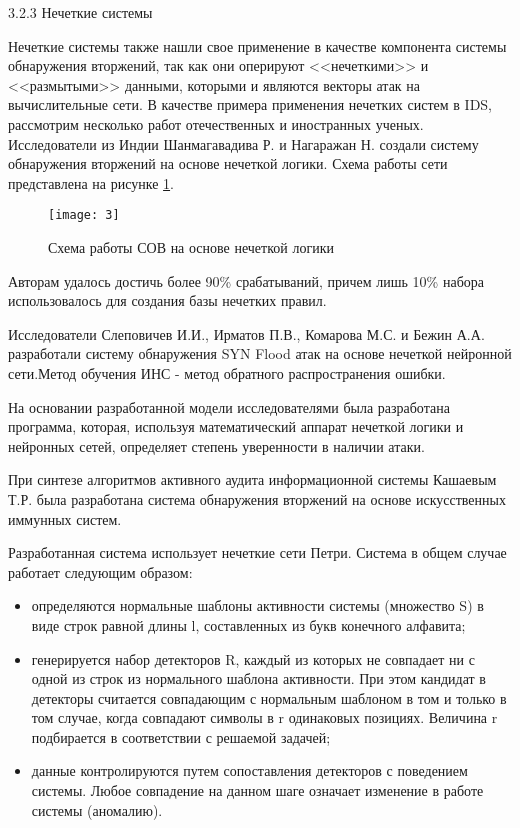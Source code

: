 3.2.3  Нечеткие системы\par 

Нечеткие системы также нашли свое применение в качестве компонента системы обнаружения вторжений, так как они оперируют <<нечеткими>> и <<размытыми>> данными, которыми и являются векторы атак на вычислительные сети. В качестве примера применения нечетких систем в IDS, рассмотрим несколько работ отечественных и иностранных ученых.
Исследователи из Индии Шанмагавадива Р. и Нагаражан Н. создали систему обнаружения вторжений на основе нечеткой логики. Схема работы сети представлена на рисунке \ref{img:3}.\par

\begin{figure}[h!]
    \centering
    \texttt{[image: 3]}
    \caption{Схема работы СОВ на основе нечеткой логики}
    \label{img:3}
\end{figure} 

Авторам удалось достичь более 90\% срабатываний, причем лишь 10\% набора использовалось для создания базы нечетких правил.\par 

Исследователи Слеповичев И.И.,  Ирматов П.В.,  Комарова М.С.  и Бежин А.А. разработали систему обнаружения SYN  Flood  атак на основе нечеткой нейронной сети.Метод обучения ИНС - метод обратного распространения ошибки.\par 

На основании разработанной модели исследователями была разработана программа, которая, используя математический аппарат нечеткой логики и нейронных сетей, определяет степень уверенности в наличии атаки.\par 

При синтезе алгоритмов активного аудита информационной системы Кашаевым Т.Р. была разработана система обнаружения вторжений на основе искусственных иммунных систем.\par 

Разработанная система использует нечеткие сети Петри. Система в общем случае работает следующим образом:
\begin{itemize}
\item определяются нормальные шаблоны активности системы (множество S) в виде строк равной длины l, составленных из букв конечного алфавита;
\item генерируется набор детекторов R, каждый из которых не совпадает ни с одной из строк из нормального шаблона активности. При этом кандидат в детекторы считается совпадающим с нормальным шаблоном в том и только в том случае, когда совпадают символы в r одинаковых позициях. Величина r подбирается в соответствии с решаемой задачей;
\item данные контролируются путем сопоставления детекторов с поведением системы. Любое совпадение на данном шаге означает изменение в работе системы (аномалию).
\end{itemize}

